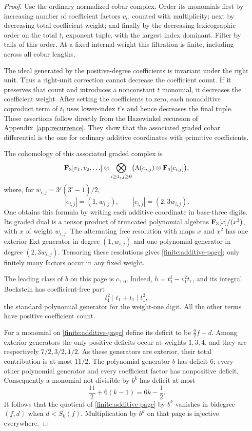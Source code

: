 \begin{proof}
Use the ordinary normalized cobar complex.  Order its monomials
first by increasing number of coefficient factors $v_i$, counted
with multiplicity; next by decreasing total coefficient weight;
and finally by the decreasing lexicographic order on the total
$t_i$ exponent tuple, with the largest index dominant.  Filter by
tails of this order.  At a fixed internal weight this filtration
is finite, including across all cobar lengths.

The ideal generated by the positive-degree coefficients is
invariant under the right unit.  Thus a right-unit correction cannot
decrease the coefficient count.  If it preserves that count and
introduces a nonconstant $t$ monomial, it decreases the coefficient
weight.  After setting the coefficients to zero, each nonadditive
coproduct term of $t_i$ uses lower-index $t$'s and hence decreases
the final tuple.  These assertions follow directly from the
Hazewinkel recursion of Appendix~\ref{app:recurrence}.  They show
that the associated graded cobar differential is the one for
ordinary additive coordinates with primitive coefficients.

The cohomology of this associated graded complex is
\begin{equation}\label{finite:additive-page}
 \mathbf F_3[v_1,v_2,\ldots]\otimes
 \bigotimes_{i\geq1,\,j\geq0}
 \bigl(\Lambda(e_{i,j})\otimes\mathbf F_3[c_{i,j}]\bigr),
\end{equation}
where, for $w_{i,j}=3^j(3^i-1)/2$,
\[
 |e_{i,j}|=(1,w_{i,j}),\qquad |c_{i,j}|=(2,3w_{i,j}).
\]
One obtains this formula by writing each additive coordinate in
base-three digits.  Its graded dual is a tensor product of
truncated polynomial algebras $\mathbf F_3[x]/(x^3)$, with $x$ of weight
$w_{i,j}$.  The alternating free resolution with maps $x$ and
$x^2$ has one exterior Ext generator in degree $(1,w_{i,j})$ and
one polynomial generator in degree $(2,3w_{i,j})$.  Tensoring these
resolutions gives \eqref{finite:additive-page}; only finitely many
factors occur in any fixed weight.

The leading class of $b$ on this page is $c_{1,0}$.  Indeed,
$h=t_1^3-v_1^2t_1$, and its integral Bockstein has coefficient-free
part
\[
 t_1^2\mid t_1+t_1\mid t_1^2,
\]
the standard polynomial generator for the weight-one digit.
All the other terms have positive coefficient count.

For a monomial on \eqref{finite:additive-page} define its deficit
to be $\frac92f-d$.  Among exterior generators the only positive
deficits occur at weights $1,3,4$, and they are respectively
$7/2,3/2,1/2$.  As these generators are exterior, their total
contribution is at most $11/2$.  The polynomial generator $b$
has deficit $6$; every other polynomial generator and every
coefficient factor has nonpositive deficit.  Consequently a
monomial not divisible by $b^k$ has deficit at most
\[
 \frac{11}{2}+6(k-1)=6k-\frac12.
\]
It follows that the quotient of \eqref{finite:additive-page} by
$b^k$ vanishes in bidegree $(f,d)$ when $d<S_k(f)$.
Multiplication by $b^k$ on that page is injective everywhere.


\end{proof}
